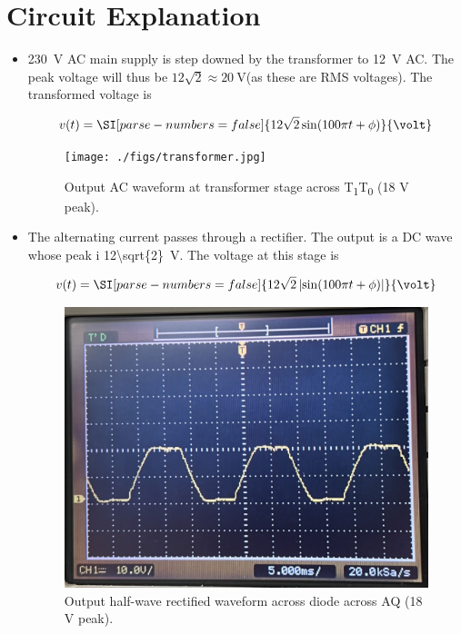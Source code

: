 \documentclass[journal,12pt,twocolumn]{IEEEtran}
\providecommand{\abs}[1]{\left\vert#1\right\vert}
\numberwithin{equation}{section}
\numberwithin{figure}{section}
\begin{document}
	\section{Circuit Explanation}
	\begin{itemize}
	\item \SI{230}{\volt} AC main supply is step downed by the transformer to \SI{12}{\volt} AC. The peak voltage will thus be $12\sqrt{2} \approx \SI{20}{\volt}$(as these are RMS voltages). The transformed voltage is
	
	\begin{align}
		v(t) = \SI[parse-numbers=false]{12\sqrt{2}\sin(100\pi t + \phi)}{\volt}
	\end{align}
	
	\begin{figure}[!ht]
		\centering
		\texttt{[image: ./figs/transformer.jpg]}
		\caption{Output AC waveform at transformer stage across T\textsubscript{1}T\textsubscript{0} (18 V peak).}
		\label{fig-transformer}	
	\end{figure}
	
	\item The alternating current passes through a rectifier. The output is a DC wave whose peak i \SI[parse-numbers=false]{12\sqrt{2}}{\volt}. The voltage at this stage is 
	
	\begin{align}
		v(t) = \SI[parse-numbers=false]{12\sqrt{2}\abs{\sin(100\pi t + \phi)}}{\volt}
	\end{align}
	
	\begin{figure}[!ht]
		\centering
		\includegraphics[width=\columnwidth]{./figs/rectifier.jpg}
		\caption{Output half-wave rectified waveform across diode across AQ (18 V peak).}
		\label{fig-rectifier}	
	\end{figure}
	

\end{itemize}
\end{document}
